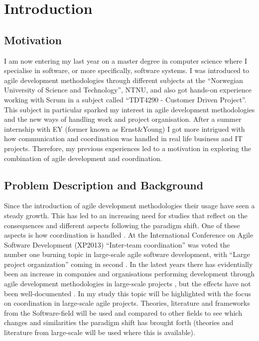 \chapter{Introduction}

\minitoc

\newpage

\section{Motivation}

I am now entering my last year on a master degree in computer science where I specialise in software, or more specifically, software systems. I was introduced to agile development methodologies through different subjects at the ``Norwegian University of Science and Technology'', NTNU, and also got hands-on experience working with Scrum in a subject called ``TDT4290 - Customer Driven Project''. This subject in particular sparked my interest in agile development methodologies and the new ways of handling work and project organisation. After a summer internship with EY (former known as Ernst\&Young) I got more intrigued with how communication and coordination was handled in real life business and IT projects. Therefore, my previous experiences led to a motivation in exploring the combination of agile development and coordination.

\section{Problem Description and Background}


Since the introduction of agile development methodologies their usage have seen a steady growth. This has led to an increasing need for studies that reflect on the consequences and different aspects following the paradigm shift. One of these aspects is how coordination is handled \cite{Agerfalk2006, Leffingwell2007, Cockburn2002, Batra2010}. At the International Conference on Agile Software Development (XP2013) ``Inter-team coordination'' was voted the number one burning topic in large-scale agile software development, with ``Large project organization'' coming in second \cite{Dingsoyr2013b}.  In the latest years there has evidentially been an increase in companies and organisations performing development through agile development methodologies in large-scale projects \cite{Paasivaara2012, Com2013, Vlietland2015, Lindvall2004, Dingsoyr2013b, Lee2008, Paasivaara2009}, but the effects have not been well-documented \cite{Pikkarainen2008, Paasivaara2012, Freudenberg2010, Haaster2014, Dingsoyr2013a, Reifer2003}. In my study this topic will be highlighted with the focus on coordination in large-scale agile projects. Theories, literature and frameworks from the Software-field will be used and compared to other fields to see which changes and similarities the paradigm shift has brought forth (theories and literature from large-scale will be used where this is available).

